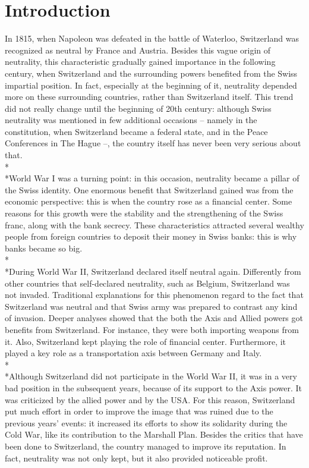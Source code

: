 \documentclass[a4paper]{article}
\begin{document}
\section{Introduction}
\label{sec:introduction}
In 1815, when Napoleon was defeated in the battle of Waterloo, Switzerland was recognized as neutral by France and Austria. Besides this vague origin of neutrality, this characteristic gradually gained importance in the following century, when Switzerland and the surrounding powers benefited from the Swiss impartial position. In fact, especially at the beginning of it, neutrality depended more on these surrounding countries, rather than Switzerland itself. This trend did not really change until the beginning of 20th century: although Swiss neutrality was mentioned in few additional occasions – namely in the constitution, when Switzerland became a federal state, and in the Peace Conferences in The Hague –, the country itself has never been very serious about that.
\\*\\*World War I was a turning point: in this occasion, neutrality became a pillar of the Swiss identity. One enormous benefit that Switzerland gained was from the economic perspective: this is when the country rose as a financial center. Some reasons for this growth were the stability and the strengthening of the Swiss franc, along with the bank secrecy. These characteristics attracted several wealthy people from foreign countries to deposit their money in Swiss banks: this is why banks became so big.
\\*\\*During World War II, Switzerland declared itself neutral again. Differently from other countries that self-declared neutrality, such as Belgium, Switzerland was not invaded. Traditional explanations for this phenomenon regard to the fact that Switzerland was neutral and that Swiss army was prepared to contrast any kind of invasion. Deeper analyses showed that the both the Axis and Allied powers got benefits from Switzerland. For instance, they were both importing weapons from it. Also, Switzerland kept playing the role of financial center. Furthermore, it played a key role as a transportation axis between Germany and Italy.
\\*\\*Although Switzerland did not participate in the World War II, it was in a very bad position in the subsequent years, because of its support to the Axis power. It was criticized by the allied power and by the USA. For this reason, Switzerland put much effort in order to improve the image that was ruined due to the previous years' events: it increased its efforts to show its solidarity during the Cold War, like its contribution to the Marshall Plan. Besides the critics that have been done to Switzerland, the country managed to improve its reputation. In fact, neutrality was not only kept, but it also provided noticeable profit. 
\end{document}
